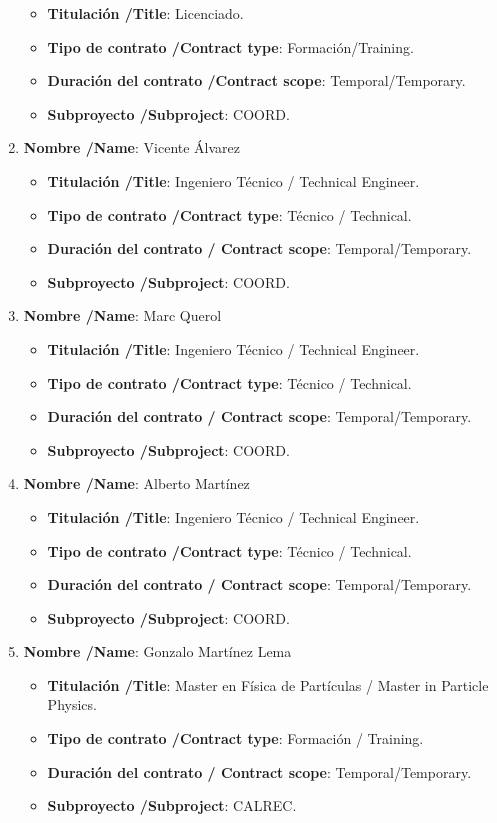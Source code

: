 \begin{enumerate}
\begin{itemize}
\item {\bf Titulación /Title}: Licenciado. 
\item {\bf Tipo de contrato /Contract type}: Formación/Training. 
\item {\bf Duración del contrato /Contract scope}: Temporal/Temporary. 
\item {\bf Subproyecto /Subproject}: COORD. 
\end{itemize}
\item {\bf Nombre /Name}: Vicente Álvarez
\begin{itemize}
\item {\bf Titulación /Title}: Ingeniero Técnico / Technical Engineer.  
\item {\bf Tipo de contrato /Contract type}: Técnico / Technical. 
\item {\bf Duración del contrato / Contract scope}: Temporal/Temporary. 
\item {\bf Subproyecto /Subproject}: COORD. 
\end{itemize}
\item {\bf Nombre /Name}: Marc Querol
\begin{itemize}
\item {\bf Titulación /Title}: Ingeniero Técnico / Technical Engineer.  
\item {\bf Tipo de contrato /Contract type}: Técnico / Technical. 
\item {\bf Duración del contrato / Contract scope}: Temporal/Temporary. 
\item {\bf Subproyecto /Subproject}: COORD. 
\end{itemize}
\item {\bf Nombre /Name}: Alberto Martínez
\begin{itemize}
\item {\bf Titulación /Title}: Ingeniero Técnico / Technical Engineer.  
\item {\bf Tipo de contrato /Contract type}: Técnico / Technical. 
\item {\bf Duración del contrato / Contract scope}: Temporal/Temporary. 
\item {\bf Subproyecto /Subproject}: COORD. 
\end{itemize}
\item {\bf Nombre /Name}: Gonzalo Mart\'inez Lema
\begin{itemize}
\item {\bf Titulación /Title}: Master en F\'isica de Part\'iculas / Master in Particle Physics.  
\item {\bf Tipo de contrato /Contract type}: Formación / Training. 
\item {\bf Duración del contrato / Contract scope}: Temporal/Temporary. 
\item {\bf Subproyecto /Subproject}: CALREC. 
\end{itemize}
\end{enumerate}


